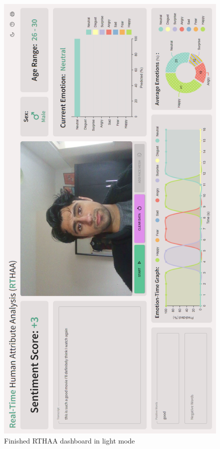 \documentclass[12pt, a4paper]{article}
\begin{document}
\begin{appendices}
\begin{figure}[H]
    \centering
    \includegraphics[scale=0.58]{images/webappFE12.png}
    \caption{Finished RTHAA dashboard in light mode}
    \label{fig:wa8}
\end{figure}


\end{appendices}
\end{document}
